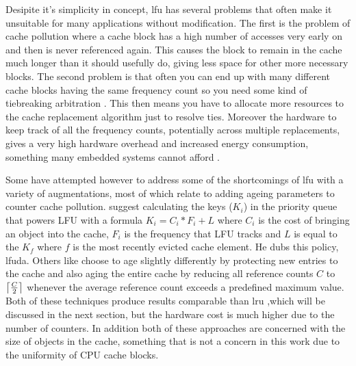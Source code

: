 Desipite it's simplicity in concept, \gls{lfu} has several problems that often make it unsuitable for many applications without modification. The first is the problem of cache pollution \cite{karedlaCachingStrategiesImprove1994} where a cache block has a high number of accesses very early on and then is never referenced again. This causes the block to remain in the cache much longer than it should usefully do, giving less space for other more necessary blocks. The second problem is that often you can end up with many different cache blocks having the same frequency count so you need some kind of tiebreaking arbitration \cite{podlipnigSurveyWebCache2003}. This then means you  have to allocate more resources to the cache replacement algorithm just to resolve ties. Moreover the hardware to keep track of all the frequency counts, potentially across multiple replacements, gives a very high hardware overhead and increased energy consumption, something many embedded systems cannot afford \cite{pandaSurveyReplacementStrategies2016}. 

Some have attempted however to address some of the shortcomings of \gls{lfu} with a variety of augmentations, most of which relate to adding ageing parameters to counter cache pollution. \citet{arlittEvaluatingContentManagement2000} suggest calculating the keys ($K_i$) in the priority queue that powers LFU with a formula $K_i = C_i * F_i + L$ where $C_i$ is the cost of bringing an object into the cache, $F_i$ is the frequency that LFU tracks and $L$ is equal to the $K_f$ where $f$ is the most recently evicted cache element. He dubs this policy, \gls{lfuda}. Others like \citet{robinsonDataCacheManagement1990} choose to age slightly differently by protecting new entries to the cache and also aging the entire cache by reducing all reference counts $C$ to $\ceil[\big]{\frac{C}{2}}$ whenever the average reference count exceeds a predefined maximum value. Both of these techniques produce results comparable than \gls{lru} ,which will be discussed in the next section, but the hardware cost is much higher due to the number of counters. In addition both of these approaches are concerned with the size of objects in the cache, something that is not a concern in this work due to the uniformity of CPU cache blocks.

